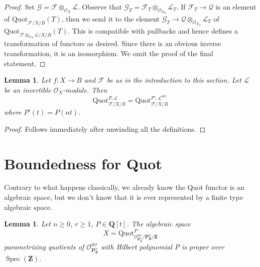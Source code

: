 \documentclass{stacks-project}
\theoremstyle{plain}
\newtheorem{lemma}[subsection]{Lemma}
\theoremstyle{definition}
\theoremstyle{remark}
\numberwithin{equation}{subsection}
\def\Spec{\mathop{\mathrm{Spec}}}
\def\Quotfunctor{\mathrm{Quot}}
\begin{document}
\begin{proof}
Set $\mathcal{G} = \mathcal{F} \otimes_{\mathcal{O}_X} \mathcal{L}$.
Observe that
$\mathcal{G}_T = \mathcal{F}_T \otimes_{\mathcal{O}_{X_T}} \mathcal{L}_T$.
If $\mathcal{F}_T \to \mathcal{Q}$ is an element of
$\Quotfunctor_{\mathcal{F}/X/B}(T)$, then we send it
to the element
$\mathcal{G}_T \to \mathcal{Q} \otimes_{\mathcal{O}_{X_T}} \mathcal{L}_T$
of
$\Quotfunctor_{\mathcal{F} \otimes_{\mathcal{O}_X} \mathcal{L}/X/B}(T)$.
This is compatible with pullbacks and hence
defines a transformation of functors as desired.
Since there is an obvious inverse transformation,
it is an isomorphism. We omit the proof of the final statement.
\end{proof}

\begin{lemma}
\label{lemma-quot-power-invertible}
Let $f : X \to B$ and $\mathcal{F}$ be as in the introduction to this section.
Let $\mathcal{L}$ be an invertible $\mathcal{O}_X$-module.
Then
$$
\Quotfunctor^{P, \mathcal{L}}_{\mathcal{F}/X/B} =
\Quotfunctor^{P', \mathcal{L}^{\otimes n}}_{\mathcal{F}/X/B}
$$
where $P'(t) = P(nt)$.
\end{lemma}

\begin{proof}
Follows immediately after unwinding all the definitions.
\end{proof}






\section{Boundedness for Quot}
\label{section-quot-bounded}

\noindent
Contrary to what happens classically, we already know the Quot
functor is an algebraic space, but we don't know that it is
ever represented by a finite type algebraic space.

\begin{lemma}
\label{lemma-quot-Pn}
Let $n \geq 0$, $r \geq 1$, $P \in \mathbf{Q}[t]$.
The algebraic space
$$
X = \Quotfunctor^P_{\mathcal{O}^{\oplus r}_{\mathbf{P}^n_\mathbf{Z}}/
\mathbf{P}^n_\mathbf{Z}/\mathbf{Z}}
$$
parametrizing quotients of $\mathcal{O}_{\mathbf{P}^n_\mathbf{Z}}^{\oplus r}$
with Hilbert polynomial $P$ is proper over $\Spec(\mathbf{Z})$.
\end{lemma}
\end{document}
